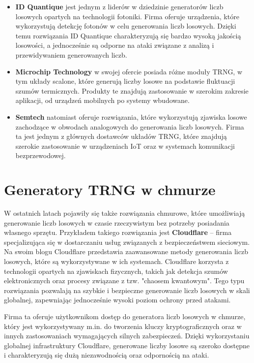 \begin{itemize}
    \item \textbf{ID Quantique} jest jednym z liderów w dziedzinie generatorów liczb losowych opartych na technologii fotoniki. Firma oferuje urządzenia, które wykorzystują detekcję fotonów w celu generowania liczb losowych. Dzięki temu rozwiązania ID Quantique charakteryzują się bardzo wysoką jakością losowości, a jednocześnie są odporne na ataki związane z analizą i przewidywaniem generowanych liczb.

    \item \textbf{Microchip Technology} w swojej ofercie posiada różne moduły TRNG, w tym układy scalone, które generują liczby losowe na podstawie fluktuacji szumów termicznych. Produkty te znajdują zastosowanie w szerokim zakresie aplikacji, od urządzeń mobilnych po systemy wbudowane.

    \item \textbf{Semtech} natomiast oferuje rozwiązania, które wykorzystują zjawiska losowe zachodzące w obwodach analogowych do generowania liczb losowych. Firma ta jest jednym z głównych dostawców układów TRNG, które znajdują szerokie zastosowanie w urządzeniach IoT oraz w systemach komunikacji bezprzewodowej.
\end{itemize}

\section{Generatory TRNG w chmurze}

W ostatnich latach pojawiły się także rozwiązania chmurowe, które umożliwiają generowanie liczb losowych w czasie rzeczywistym bez potrzeby posiadania własnego sprzętu. Przykładem takiego rozwiązania jest \textbf{Cloudflare} – firma specjalizująca się w dostarczaniu usług związanych z bezpieczeństwem sieciowym. Na swoim blogu Cloudflare przedstawia zaawansowane metody generowania liczb losowych, które są wykorzystywane w ich systemach. Cloudflare korzysta z technologii opartych na zjawiskach fizycznych, takich jak detekcja szumów elektronicznych oraz procesy związane z tzw. "chaosem kwantowym". Tego typu rozwiązania pozwalają na szybkie i bezpieczne generowanie liczb losowych w skali globalnej, zapewniając jednocześnie wysoki poziom ochrony przed atakami.

Firma ta oferuje użytkownikom dostęp do generatora liczb losowych w chmurze, który jest wykorzystywany m.in. do tworzenia kluczy kryptograficznych oraz w innych zastosowaniach wymagających silnych zabezpieczeń. Dzięki wykorzystaniu globalnej infrastruktury Cloudflare, generowane liczby losowe są szeroko dostępne i charakteryzują się dużą niezawodnością oraz odpornością na ataki.


